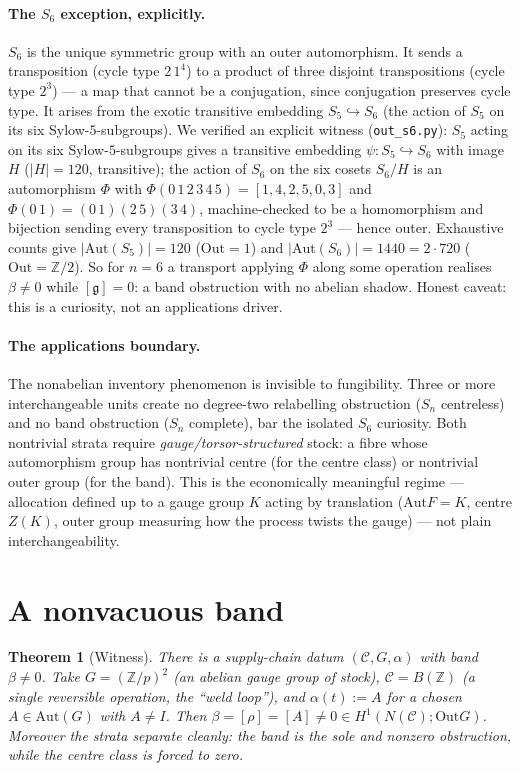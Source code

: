 \documentclass[11pt]{article}
\newtheorem{theorem}{Theorem}
\theoremstyle{definition}
\newcommand{\C}{\mathcal{C}}
\newcommand{\Z}{\mathbb{Z}}
\newcommand{\Aut}{\mathrm{Aut}}
\newcommand{\Out}{\mathrm{Out}}
\newcommand{\gerbe}{\mathfrak{g}}
\begin{document}
\paragraph{The $S_6$ exception, explicitly.} $S_6$ is the unique symmetric group with an outer
automorphism. It sends a transposition (cycle type $2\,1^4$) to a product of three disjoint
transpositions (cycle type $2^3$) --- a map that cannot be a conjugation, since conjugation preserves
cycle type. It arises from the exotic transitive embedding $S_5\hookrightarrow S_6$ (the action of
$S_5$ on its six Sylow-$5$-subgroups). We verified an explicit witness (\texttt{out\_s6.py}): $S_5$
acting on its six Sylow-$5$-subgroups gives a transitive embedding $\psi:S_5\hookrightarrow S_6$ with
image $H$ ($|H|=120$, transitive); the action of $S_6$ on the six cosets $S_6/H$ is an automorphism
$\Phi$ with $\Phi(0\,1\,2\,3\,4\,5)=[1,4,2,5,0,3]$ and $\Phi(0\,1)=(0\,1)(2\,5)(3\,4)$, machine-checked
to be a homomorphism and bijection sending every transposition to cycle type $2^3$ --- hence outer.
Exhaustive counts give $|\Aut(S_5)|=120$ ($\Out=1$) and $|\Aut(S_6)|=1440=2\cdot 720$ ($\Out=\Z/2$).
So for $n=6$ a transport applying $\Phi$ along some operation realises $\beta\neq0$ while $[\gerbe]=0$:
a band obstruction with no abelian shadow. Honest caveat: this is a curiosity, not an applications
driver.

\paragraph{The applications boundary.} The nonabelian inventory phenomenon is invisible to
fungibility. Three or more interchangeable units create no degree-two relabelling obstruction ($S_n$
centreless) and no band obstruction ($S_n$ complete), bar the isolated $S_6$ curiosity. Both
nontrivial strata require \emph{gauge/torsor-structured} stock: a fibre whose automorphism group has
nontrivial centre (for the centre class) or nontrivial outer group (for the band). This is the
economically meaningful regime --- allocation defined up to a gauge group $K$ acting by translation
($\Aut F=K$, centre $Z(K)$, outer group measuring how the process twists the gauge) --- not plain
interchangeability.

\section{A nonvacuous band}\label{sec:c}

\begin{theorem}[Witness]\label{thm:c}
There is a supply-chain datum $(\C,G,\alpha)$ with band $\beta\neq0$. Take $G=(\Z/p)^2$ (an abelian
gauge group of stock), $\C=B(\Z)$ (a single reversible operation, the ``weld loop''), and
$\alpha(t):=A$ for a chosen $A\in\Aut(G)$ with $A\neq I$. Then
$\beta=[\rho]=[A]\neq0\in H^1(N(\C);\Out G)$. Moreover the strata separate cleanly: the band is the
sole and nonzero obstruction, while the centre class is forced to zero.
\end{theorem}
\end{document}
